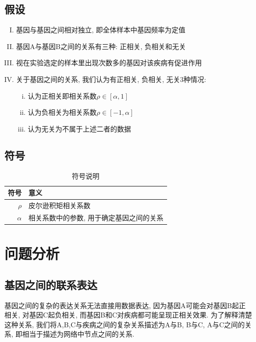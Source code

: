 \documentclass[zihao=-4]{ctexart}
\begin{document}
\subsection{假设}

\begin{enumerate}[I.]
    \item 基因与基因之间相对独立, 即全体样本中基因频率为定值
    \item 基因A与基因B之间的关系有三种: 正相关, 负相关和无关
    \item 视在实验选定的样本里出现次数多的基因对该疾病有促进作用
    \item 关于基因之间的关系, 我们认为有正相关, 负相关, 无关3种情况:
    \begin{enumerate}[i.]
        \item 认为正相关即相关系数$\rho \in [\alpha, 1]$
        \item 认为负相关为相关系数$\rho \in [-1,\alpha]$
        \item 认为无关为不属于上述二者的数据
    \end{enumerate}
\end{enumerate}

\subsection{符号}
\begin{table}[H]
    \centering
    \caption{符号说明}
    \begin{tabular}{r|l}
        \hline
        符号 & 意义\\
        \hline
        $\rho$ & 皮尔逊积矩相关系数\\
        $\alpha$ & 相关系数中的参数, 用于确定基因之间的关系\\
        \hline
    \end{tabular}
    
\end{table}



\section{问题分析}
\subsection{基因之间的联系表达}
基因之间的复杂的表达关系无法直接用数据表达, 因为基因A可能会对基因B起正相关, 对基因C起负相关, 而基因B和C对疾病都可能呈现正相关效果. 为了解释清楚这种关系, 我们将A,B,C与疾病之间的复杂关系描述为A与B, B与C, A与C之间的关系, 即相当于描述为网络中节点之间的关系.
\end{document}
